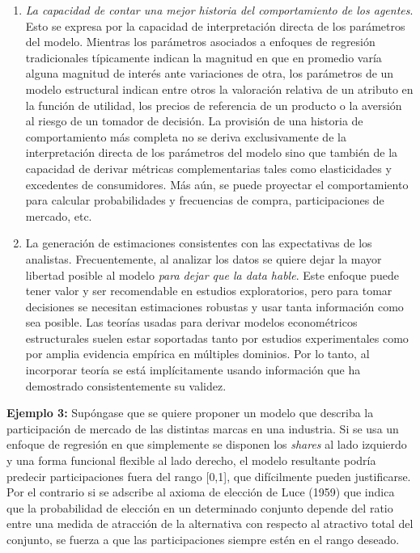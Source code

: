 \documentclass[
]{book}
\begin{document}
\begin{enumerate}
\def\labelenumi{\arabic{enumi}.}
\item
  \emph{La capacidad de contar una mejor historia del comportamiento de los agentes}. Esto se expresa por la capacidad de interpretación directa de los parámetros del modelo. Mientras los parámetros asociados a enfoques de regresión tradicionales típicamente indican la magnitud en que en promedio varía alguna magnitud de interés ante variaciones de otra, los parámetros de un modelo estructural indican entre otros la valoración relativa de un atributo en la función de utilidad, los precios de referencia de un producto o la aversión al riesgo de un tomador de decisión. La provisión de una historia de comportamiento más completa no se deriva exclusivamente de la interpretación directa de los parámetros del modelo sino que también de la capacidad de derivar métricas complementarias tales como elasticidades y excedentes de consumidores. Más aún, se puede proyectar el comportamiento para calcular probabilidades y frecuencias de compra, participaciones de mercado, etc.
\item
  La generación de estimaciones consistentes con las expectativas de los analistas. Frecuentemente, al analizar los datos se quiere dejar la mayor libertad posible al modelo \emph{para dejar que la data hable}. Este enfoque puede tener valor y ser recomendable en estudios exploratorios, pero para tomar decisiones se necesitan estimaciones robustas y usar tanta información como sea posible. Las teorías usadas para derivar modelos econométricos estructurales suelen estar soportadas tanto por estudios experimentales como por amplia evidencia empírica en múltiples dominios. Por lo tanto, al incorporar teoría se está implícitamente usando información que ha demostrado consistentemente su validez.
\end{enumerate}

\textbf{Ejemplo 3:} Supóngase que se quiere proponer un modelo que describa la participación de mercado de las distintas marcas en una industria. Si se usa un enfoque de regresión en que simplemente se disponen los \emph{shares} al lado izquierdo y una forma funcional flexible al lado derecho, el modelo resultante podría predecir participaciones fuera del rango {[}0,1{]}, que difícilmente pueden justificarse. Por el contrario si se adscribe al axioma de elección de Luce (1959) que indica que la probabilidad de elección en un determinado conjunto depende del ratio entre una medida de atracción de la alternativa con respecto al atractivo total del conjunto, se fuerza a que las participaciones siempre estén en el rango deseado.
\end{document}

